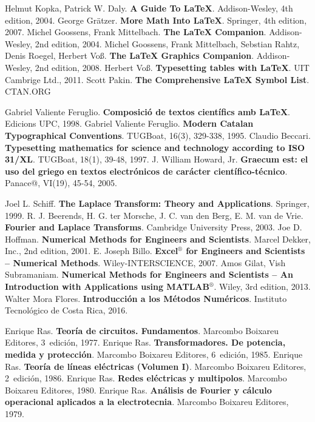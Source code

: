 \begin{thebibliography}{99}


     Helmut Kopka, Patrick W. Daly. \textbf{A Guide To \LaTeX}.  Addison-Wesley, 4th edition, 2004.
     George Grätzer. \textbf{More Math Into \LaTeX}.  Springer, 4th edition, 2007.
     Michel Goossens, Frank Mittelbach. \textbf{The \LaTeX{} Companion}.  Addison-Wesley, 2nd edition, 2004.
     Michel Goossens, Frank Mittelbach, Sebstian Rahtz, Denis Roegel, Herbert Voß. \textbf{The \LaTeX{} Graphics Companion}.  Addison-Wesley, 2nd edition, 2008.
     Herbert Voß. \textbf{Typesetting tables with \LaTeX{}}.  UIT Cambrige Ltd., 2011.
     Scott Pakin. \textbf{The Comprehensive \LaTeX{} Symbol List}. CTAN.ORG

     Gabriel Valiente Feruglio. \textbf{Composició de textos científics amb \LaTeX}.  Edicions UPC, 1998.
     Gabriel Valiente Feruglio. \textbf{Modern Catalan Typographical Conventions}.  TUGBoat, 16(3), 329-338, 1995.
     Claudio Beccari. \textbf{Typesetting mathematics for science and technology according to ISO 31/XL}.  TUGBoat, 18(1), 39-48, 1997.
     J. William Howard, Jr. \textbf{Graecum est: el uso del griego en textos electrónicos de carácter científico-técnico}.  Panace@, VI(19), 45-54, 2005.


     Joel L. Schiff. \textbf{The Laplace Transform: Theory and Applications}.  Springer, 1999.
     R. J. Beerends, H. G. ter Morsche, J. C. van den Berg, E. M. van de Vrie. \textbf{Fourier and Laplace Transforms}.  Cambridge University Press, 2003.
     Joe D. Hoffman. \textbf{Numerical Methods for Engineers and Scientists}.  Marcel Dekker, Inc., 2nd edition, 2001.
     E. Joseph Billo. \textbf{Excel${}^\circledR$ for Engineers and Scientists -- Numerical Methods}.  Wiley-INTERSCIENCE, 2007.
     Amos Gilat, Vish Subramaniam. \textbf{Numerical Methods for Engineers and Scientists --
        An Introduction with Applications using MATLAB${}^\circledR$}.  Wiley, 3rd edition, 2013.
     Walter Mora Flores. \textbf{Introducción a los Métodos Numéricos}.  Instituto Tecnológico de Costa Rica, 2016.

     Enrique Ras. \textbf{Teoría de circuitos. Fundamentos}.  Marcombo Boixareu Editores, 3\textordfeminine\ edición, 1977.
     Enrique Ras. \textbf{Transformadores. De potencia, medida y protección}.  Marcombo Boixareu Editores, 6\textordfeminine\ edición, 1985.
     Enrique Ras. \textbf{Teoría de líneas eléctricas (Volumen I)}.  Marcombo Boixareu Editores, 2\textordfeminine\ edición, 1986.
     Enrique Ras. \textbf{Redes eléctricas y multipolos}.  Marcombo Boixareu Editores, 1980.
     Enrique Ras. \textbf{Análisis de Fourier y cálculo operacional aplicados a la electrotecnia}.  Marcombo Boixareu Editores, 1979.


\end{thebibliography}
